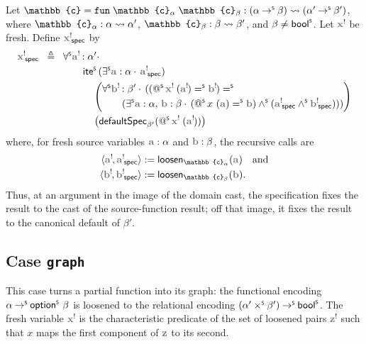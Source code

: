 \begin{definition}
Let $\mathbb{c} = \mathtt{fun}\;\mathbb{c}_\alpha\;\mathbb{c}_\beta : \castpath{(\alpha \toS \beta)}{(\alpha' \toS \beta')}$, where $\mathbb{c}_\alpha : \castpath{\alpha}{\alpha'}$, $\mathbb{c}_\beta : \castpath{\beta}{\beta'}$, and $\beta \neq \mathsf{bool}^{\scriptscriptstyle{\mathsf{S}}}$. Let $\lvar{x}$ be fresh. Define $\spec{\lvar{x}}$ by
  \vspace{-.5\baselineskip}
\begin{align*}
  \spec{\lvar{x}} \;\;\triangleq\;\; {} & \forallS \lvar{a} : \alpha'\cdot\, \\
  &\qquad \iteS \left(\existsS \var{a} : \alpha\cdot\, \spec{\lvar{a}}\right) \\
  &\qquad\quad \left(
    \begin{aligned}
      &\forallS \lvar{b} : \beta'\cdot\, ((\appS{\lvar{x}}{(\lvar{a})} \eqS \lvar{b}) \eqS {}\\
      &\qquad (\existsS \var{a} : \alpha,\, \var{b} : \beta\cdot\, (\appS x (\var{a}) \eqS \var{b}) \andS (\spec{\lvar{a}} \andS \spec{\lvar{b}})))
    \end{aligned}
  \right) \\
  &\qquad\quad \left(\mathsf{defaultSpec}_{\beta'}(\appS{\lvar{x}}{(\lvar{a})})\right)
\end{align*}
where, for fresh source variables $\var{a} : \alpha$ and $\var{b} : \beta$, the recursive calls are
\[
  \begin{aligned}
    \langle \lvar{a}, \spec{\lvar{a}} \rangle &:= \mathsf{loosen}_{\mathbb{c}_\alpha}(\var{a})\quad\text{and}\\
    \langle \lvar{b}, \spec{\lvar{b}} \rangle &:= \mathsf{loosen}_{\mathbb{c}_\beta}(\var{b}).
  \end{aligned}
\]
Thus, at an argument in the image of the domain cast, the specification fixes the result to the cast of the source-function result; off that image, it fixes the result to the canonical default of $\beta'$.
\end{definition}

\subsection{Case \texttt{graph}}\label{case:graph}
This case turns a partial function into its graph: the functional encoding $\alpha \mathbin{\to^{\scriptscriptstyle{\mathsf{S}}}} \mathord{\mathsf{option}^{\scriptscriptstyle{\mathsf{S}}}}\,\,\beta$ is loosened to the relational encoding $(\alpha' \mathbin{\times^{\scriptscriptstyle{\mathsf{S}}}} \beta') \mathbin{\to^{\scriptscriptstyle{\mathsf{S}}}} \mathsf{bool}^{\scriptscriptstyle{\mathsf{S}}}$. The fresh variable $\lvar{x}$ is the characteristic predicate of the set of loosened pairs $\lvar{z}$ such that $x$ maps the first component of $\var{z}$ to its second.

